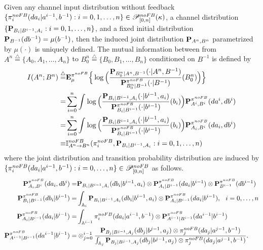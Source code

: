 \documentclass[11pt, a4paper, journal,onecolumn]{IEEEtran}
\newcommand{\mb}{\mathbb}
\newcommand{\sr}{\stackrel}
\newcommand{\rar}{\rightarrow}
\newcommand{\tri}{\sr{\triangle}{=}}
\newcommand{\hso}{\hspace{.1in}}
\begin{document}
\par Given any channel input distribution without feedback $\{{\pi}^{noFB}_{i}(d{a}_i|a^{i-1},b^{-1}): i=0,1, \ldots, n\} \in {\cal P}_{[0,n]}^{noFB}(\kappa)$,  a channel distribution $\{{\bf P}_{B_i|B^{i-1}, A_i}: i=0,1, \ldots, n\}$, and a fixed initial distribution ${\bf P}_{B^{-1}}(db^{-1})=\mu(b^{-1})$,  then the  induced joint distribution ${\bf  P}_{A^n, B^n}$ parametrized by $\mu(\cdot)$ is uniquely defined. The mutual information between from $A^n\tri\{A_0,A_1,\ldots,A_n\}$ to $B_0^n\tri\{B_0,B_1,\ldots,B_n\}$ conditioned on $B^{-1}$ is defined by 
\begin{align}
I(A^n ; B^n)\tri 
& {\bf E}_\mu^{\pi^{noFB}}\Big\{ \log \Big( \frac{ {\bf P}_{B_0^n|A^n,B^{-1}}(\cdot|A^n,B^{-1}) }{{\bf P}_{B_0^n|B^{-1}}^{\pi^{noFB}}(\cdot|B^{-1})}(B_0^n)\Big)\Big\} \nonumber \\
=&\sum_{i=0}^n \int_{  }^{} \log \Big( \frac{ {\bf P}_{B_i|B^{i-1}, A_i}(\cdot|b^{i-1}, a_i) }{{\bf P}_{B_i|B^{i-1}}^{\pi^{noFB}}(\cdot|b^{i-1})}(b_i)\Big){ \bf P}_{A^i, B^i}^{\pi^{noFB}}( da^i, db^i)
\nonumber \\
=&\sum_{i=0}^n \int_{  }^{} \log \Big( \frac{ {\bf P}_{B_i|B^{i-1}, A_i}(\cdot|b^{i-1}, a_i) }{{\bf P}_{B_i|B^{i-1}}^{\pi^{noFB}}(\cdot|b^{i-1})}(b_i)\Big){ \bf P}_{A_i, B^i}^{\pi^{noFB}}( da_i, db^i)
\nonumber \\
\equiv & {\mathbb I}_{A^n \rar B^n}^{noFB}(\pi_i^{noFB},  {\bf P}_{B_i|B^{i-1},A_i}: i=0,1, \ldots, n)        \label{eqdi5_nFB}
\end{align}
where the joint distribution and transition probability distribution are induced by $\{\pi_i^{noFB}(da_i|a^{i-1},b^{-1}): i=0, \ldots, n\} \in {\cal P}_{[0,n]}^{noFB}$ as follows. 
\begin{align}
{\bf  P}_{A_i, B^i}^{\pi^{noFB}}(da_i, db^i)
=&{\bf P}_{B_i|B^{i-1}, A_i}(db_i|b^{i-1}, a_i)\otimes {\bf P}_{A_i|B^{i-1}}^{\pi^{noFB}}(da_i|b^{i-1})\otimes {\bf P}_{B^{i-1}}^{\pi^{noFB}}(db^{i-1}) \label{CIS_2gg_new_n_nf} \\
{\bf  P}_{B_i|B^{i-1}}^{\pi^{noFB}}(db_i|b^{i-1})=&  \int_{{\mb A}_i} {\bf P}_{B_i|B^{i-1}, A_i}(db_i|b^{i-1}, a_i)\otimes {\bf P}_{A_i|B^{i-1}}^{{\pi^{noFB}}}(da_i|b^{i-1}), \hso  i=0, \ldots, n  \label{CIS_3a}\\
{\bf P}_{A_i|B^{i-1}}^{\pi^{noFB}}(da_i|b^{i-1})=&\int_{{\mb A}^{i-1}}{\pi}^{noFB}_{i}(d{a}_i|a^{i-1},b^{-1})\otimes {\bf P}_{A^{i-1}|B^{i-1}}^{\pi^{noFB}}(da^{i-1}|b^{i-1}) \label{CIS_2gg_new_n_nf21}\\
{\bf P}_{A^{i-1}|B^{i-1}}^{\pi^{noFB}}(da^{i-1}|b^{i-1})=&\otimes_{j=0}^{i-1}\frac{{\bf P}_{B_j|B^{j-1}, A_j}(db_j|b^{j-1}, a_j)\otimes {\pi}_{j}^{noFB}(da_j|a^{j-1}, b^{-1})}{\int_{{\mb A}_{j}}{\bf P}_{B_j|B^{j-1}, A_j}(db_j|b^{j-1}, a_j)\otimes {\pi}_{j}^{noFB}(da_j|a^{j-1}, b^{-1})}. \label{CIS_2ggnf221}
\end{align}
\end{document}
